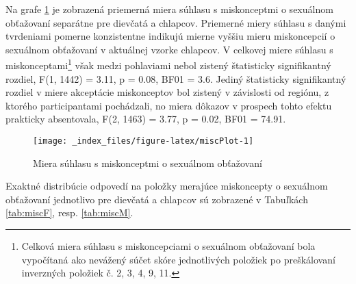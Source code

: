 \documentclass[
]{article}
\begin{document}
Na grafe \ref{fig:miscPlot} je zobrazená priemerná miera súhlasu s miskonceptmi o sexuálnom obťažovaní separátne pre dievčatá a chlapcov. Priemerné miery súhlasu s danými tvrdeniami pomerne konzistentne indikujú mierne vyššiu mieru miskoncepcií o sexuálnom obťažovaní v aktuálnej vzorke chlapcov. V celkovej miere súhlasu s miskonceptami\footnote{Celková miera súhlasu s miskoncepciami o sexuálnom obťažovaní bola vypočítaná ako nevážený súčet skóre jednotlivých položiek po preškálovaní inverzných položiek č. 2, 3, 4, 9, 11.} však medzi pohlaviami nebol zistený štatisticky signifikantný rozdiel, F(1, 1442) = 3.11, p = 0.08, BF01 = 3.6. Jediný štatisticky signifikantný rozdiel v miere akceptácie miskonceptov bol zistený v závislosti od regiónu, z ktorého participantami pochádzali, no miera dôkazov v prospech tohto efektu prakticky absentovala, F(2, 1463) = 3.77, p = 0.02, BF01 = 74.91.

\begin{figure}

{\centering \texttt{[image: \_index\_files/figure-latex/miscPlot-1]} 

}

\caption{Miera súhlasu s miskonceptmi o sexuálnom obťažovaní}\label{fig:miscPlot}
\end{figure}

Exaktné distribúcie odpovedí na položky merajúce miskoncepty o sexuálnom obťažovaní jednotlivo pre dievčatá a chlapcov sú zobrazené v Tabuľkách \ref{tab:miscF}, resp. \ref{tab:miscM}.
\end{document}
